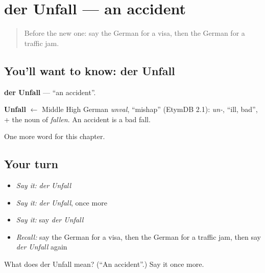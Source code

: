 \section[der Unfall]{der Unfall — an accident}

\label{lesson:GE-C155-unfall}



\begin{quote}
Before the new one: say the German for a visa, then the German for a traffic jam.
\end{quote}

\subsection*{You'll want to know: der Unfall}
\textbf{der Unfall} — \textquotedblleft{}an accident\textquotedblright{}.

\begin{cousinweb}
\textbf{Unfall} $\leftarrow$ Middle High German \emph{unval}, \textquotedblleft{}mishap\textquotedblright{} (EtymDB 2.1): \emph{un-}, \textquotedblleft{}ill, bad\textquotedblright{}, + the noun of \emph{fallen}. An accident is a bad fall.
\end{cousinweb}

\begin{grammarlens}[title={What you've built}]
One more word for this chapter.
\end{grammarlens}

\subsection*{Your turn}
\begin{itemize}
\raggedright
  \item \emph{Say it:} \emph{der Unfall}
  \item \emph{Say it:} \emph{der Unfall}, once more
  \item \emph{Say it:} say \emph{der Unfall}
  \item \emph{Recall:} say the German for a visa, then the German for a traffic jam, then say \emph{der Unfall} again
\end{itemize}

\begin{tcolorbox}[breakable,colback=teal!4,colframe=teal!35!black,title={Before you move on}]
What does der Unfall mean? (\textquotedblleft{}An accident\textquotedblright{}.) Say it once more.
\end{tcolorbox}
